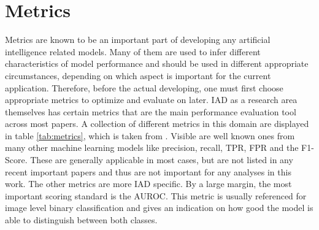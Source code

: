 \section{Metrics}
\label{sec:metrics}
Metrics are known to be an important part of developing any artificial intelligence related models. Many of them are used to infer 
different characteristics of model performance and should be used in different appropriate circumstances, depending on which aspect 
is important for the current application. Therefore, before the actual developing, one must first choose appropriate metrics 
to optimize and evaluate on later. IAD as a research area themselves has certain metrics that are the main performance evaluation tool 
across most papers.\newline 
A collection of different metrics in this domain are displayed in table \ref{tab:metrics}, which is taken from 
\cite{liu2024deep}. Visible are well known 
ones from many other machine learning models like precision, recall, TPR, FPR and the F1-Score. These are generally applicable in most 
cases, but are not listed in any recent important papers and thus are not important for any analyses in this work. The other metrics are 
more IAD specific. By a large margin, the most important scoring standard is the AUROC. This metric is usually referenced for image level 
binary classification and gives an indication on how good the model is able to distinguish between both classes. 



